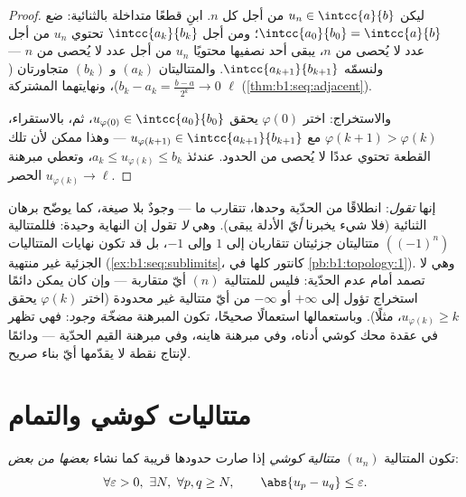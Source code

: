 \begin{proof}
ليكن $u_n \in \intcc{a}{b}$ من أجل كل $n$. ابنِ قطعًا متداخلة
بالثنائية: ضع $\intcc{a_0}{b_0} = \intcc{a}{b}$؛ ومن أجل
$\intcc{a_k}{b_k}$ تحتوي $u_n$ من أجل عدد لا يُحصى من $n$، يبقى أحد
نصفيها محتويًا $u_n$ من أجل عدد لا يُحصى من $n$ --- ولنسمّه
$\intcc{a_{k+1}}{b_{k+1}}$. والمتتاليتان $(a_k)$ و $(b_k)$
متجاورتان ($b_k - a_k = \frac{b-a}{2^k} \to 0$)، ونهايتهما المشتركة
$\ell$ (\cref{thm:b1:seq:adjacent}).

والاستخراج: اختر $\varphi(0)$ يحقق $u_{\varphi(0)} \in
\intcc{a_0}{b_0}$، ثم، بالاستقراء، $\varphi(k+1) > \varphi(k)$
مع $u_{\varphi(k+1)} \in \intcc{a_{k+1}}{b_{k+1}}$ --- وهذا ممكن
لأن تلك القطعة تحتوي عددًا لا يُحصى من الحدود. عندئذ $a_k \leq
u_{\varphi(k)} \leq b_k$، وتعطي مبرهنة الحصر
$u_{\varphi(k)} \to \ell$.
\end{proof}

\begin{remark}
إنها \emph{تقول}: انطلاقًا من الحدّية وحدها، تتقارب  ما --- وجودٌ بلا صيغة، كما يوضّح برهان الثنائية
(فلا شيء يخبرنا \emph{أيّ} الأدلة يبقى). وهي
\emph{لا} تقول إن النهاية وحيدة: فللمتتالية $((-1)^n)$
متتاليتان جزئيتان تتقاربان إلى $1$ وإلى $-1$، بل قد تكون 
نهايات المتتاليات الجزئية غير منتهية
(\cref{ex:b1:seq:sublimits}،  كانتور كلها في
\cref{pb:b1:topology:1}). وهي لا تصمد أمام عدم الحدّية:
فليس للمتتالية $(n)$ أيّ  متقاربة --- وإن كان يمكن
دائمًا استخراج  تؤول إلى $+\infty$ أو $-\infty$
من أيّ متتالية غير محدودة (اختر $\varphi(k)$ يحقق
$u_{\varphi(k)} \geq k$، مثلًا). وباستعمالها استعمالًا صحيحًا، تكون المبرهنة
\emph{مضخّة وجود}: فهي تظهر في عقدة محك كوشي
أدناه، وفي مبرهنة هاينه، وفي مبرهنة القيم
الحدّية --- ودائمًا لإنتاج نقطة لا يقدّمها أيّ بناء
صريح.
\end{remark}

\section{متتاليات كوشي والتمام}

\begin{definition}\label{def:b1:seq:cauchy}
تكون المتتالية $(u_n)$ \emph{متتالية كوشي}
إذا صارت حدودها قريبة كما نشاء \emph{بعضها من بعض}:
\[
\forall \varepsilon > 0,\ \exists N,\ \forall p, q \geq N,
\qquad \abs{u_p - u_q} \leq \varepsilon .
\]
\end{definition}

